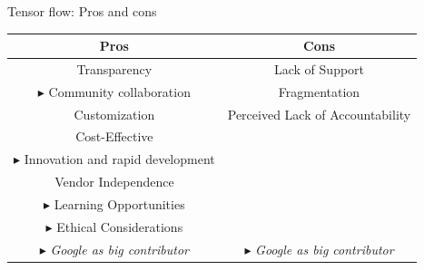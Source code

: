 \begin{frame}{Tensor flow: Pros and cons}
    \begin{table}[]
        \small
        \centering
        \def\arraystretch{1.1}
        \begin{tabular}{|c|c|}
        \hline
          \cellcolor{green!50}\textbf{Pros} & \cellcolor{red!50}\textbf{Cons} \\
        \hline
            \color{gray}Transparency & \color{gray}Lack of Support \\
            $\blacktriangleright$ Community collaboration & \color{gray}Fragmentation \\
            \color{gray} Customization & \color{gray}Perceived Lack of Accountability \\
            \color{gray} Cost-Effective & \\
            $\blacktriangleright$ Innovation and rapid development & \\
            \color{gray}Vendor Independence & \\
            $\blacktriangleright$ Learning Opportunities & \\
            $\blacktriangleright$ Ethical Considerations & \\
            $\blacktriangleright$ \textit{Google as big contributor} & $\blacktriangleright$ \textit{Google as big contributor} \\
        \hline
        \end{tabular}
    \end{table}
\end{frame}